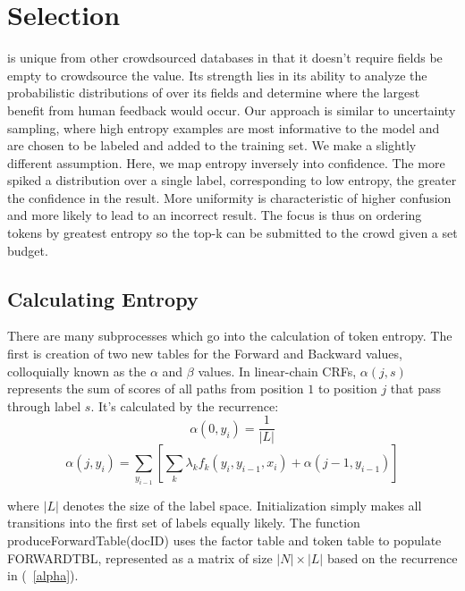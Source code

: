 \section{Selection}
\sysName is unique from other crowdsourced databases in that it doesn't require fields be empty to crowdsource the value.  Its strength lies in its ability to analyze the probabilistic distributions of over its fields and determine where the largest benefit from human feedback would occur.  Our approach is similar to uncertainty sampling, where high entropy examples are most informative to the model and are chosen to be labeled and added to the training set.  We make a slightly different assumption.  Here, we map entropy inversely into confidence.  The more spiked a distribution over a single label, corresponding to low entropy, the greater the confidence in the result.  More uniformity is characteristic of higher confusion and more likely to lead to an incorrect result.  The focus is thus on ordering tokens by greatest entropy so the top-k can be submitted to the crowd given a set budget.

\subsection{Calculating Entropy}

There are many subprocesses which go into the calculation of token entropy.  The first is creation of two new tables for the Forward and Backward values, colloquially known as the $\alpha$ and $\beta$ values.  In linear-chain CRFs, $\alpha(j,s)$ represents the sum of scores of all paths from position $1$ to position $j$ that pass through label $s$.  It's calculated by the recurrence:
\begin{equation}
\alpha(0,y_{i}) = \frac{1}{|L|}
\end{equation}
\begin{equation}
\label{alpha}
\alpha(j,y_{i}) = \sum_{y_{i-1}}[\sum_{k}\lambda_{k}f_{k}(y_{i},y_{i-1},x_{i}) + \alpha(j-1,y_{i-1})]
\end{equation}

where $|L|$ denotes the size of the label space.  Initialization simply makes all transitions into the first set of labels equally likely.  The function produceForwardTable(docID) uses the factor table and token table to populate F{\small ORWARD}T{\small BL}, represented as a matrix of size $|N|\times|L|$ based on the recurrence in (~\ref{alpha}).

